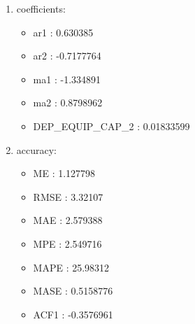 \documentclass[10pt,a4paper]{article}\usepackage[]{graphicx}\usepackage[]{color}
\newcommand{\AaA}{\_}
\begin{document}
\begin{multicols}{2}
\begin{enumerate}
\item coefficients:
\begin{itemize}
\item  ar1 :  0.630385 
\item  ar2 :  -0.7177764 
\item  ma1 :  -1.334891 
\item  ma2 :  0.8798962 
\item  DEP\AaA EQUIP\AaA CAP\AaA 2 :  0.01833599 
\end{itemize}
\item accuracy:
\begin{itemize}
\item  ME :  1.127798 
\item  RMSE :  3.32107 
\item  MAE :  2.579388 
\item  MPE :  2.549716 
\item  MAPE :  25.98312 
\item  MASE :  0.5158776 
\item  ACF1 :  -0.3576961 
\end{itemize}
\end{enumerate}
\end{multicols}
\end{document}
